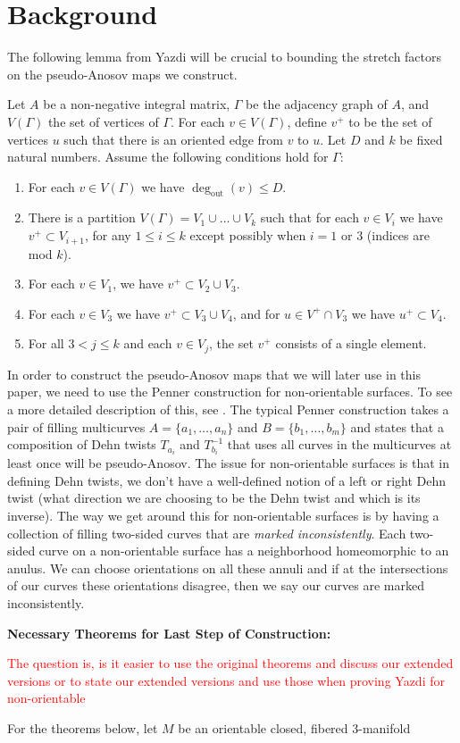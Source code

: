 \section{Background}

The following lemma from Yazdi will be crucial to bounding the stretch factors on the pseudo-Anosov maps we construct.

\begin{lem}[Yazdi]
Let $A$ be a non-negative integral matrix, $\Gamma$ be the adjacency graph of $A$, and $V(\Gamma)$ the set of vertices of $\Gamma$. For each $v \in V(\Gamma)$, define $v^+$ to be the set of vertices $u$ such that there is an oriented edge from $v$ to $u$. Let $D$ and $k$ be fixed natural numbers. Assume the following conditions hold for $\Gamma$: \begin{enumerate}
    \item For each $v \in V(\Gamma)$ we have $\deg_{\text{out}}(v) \leq D$.
    \item There is a partition $V(\Gamma) = V_1 \cup \dots \cup V_k$ such that for each $v \in V_i$ we have $v^+ \subset V_{i+1}$, for any $1 \leq i \leq k$ except possibly when $i = 1$ or 3 (indices are mod $k$).
    \item For each $v \in V_1$, we have $v^+ \subset V_2 \cup V_3$.
    \item For each $v \in V_3$ we have $v^+ \subset V_3 \cup V_4$, and for $u \in V^+ \cap V_3$ we have $u^+ \subset V_4$.
    \item For all $3 < j \leq k$ and each $v \in V_j$, the set $v^+$ consists of a single element.
\end{enumerate}
\end{lem}

In order to construct the pseudo-Anosov maps that we will later use in this paper, we need to use the Penner construction for non-orientable surfaces. To see a more detailed description of this, see \cite{Strenner_2017}. The typical Penner construction takes a pair of filling multicurves $A = \{a_1,\dots,a_n\}$ and $B = \{b_1,\dots,b_m\}$ and states that a composition of Dehn twists $T_{a_i}$ and $T_{b_i}^{-1}$ that uses all curves in the multicurves at least once will be pseudo-Anosov. The issue for non-orientable surfaces is that in defining Dehn twists, we don't have a well-defined notion of a left or right Dehn twist (what direction we are choosing to be the Dehn twist and which is its inverse). The way we get around this for non-orientable surfaces is by having a collection of filling two-sided curves that are \textit{marked inconsistently}. Each two-sided curve on a non-orientable surface has a neighborhood homeomorphic to an anulus. We can choose orientations on all these annuli and if at the intersections of our curves these orientations disagree, then we say our curves are marked inconsistently. 

\textbf{Necessary Theorems for Last Step of Construction:}

\textcolor{red}{The question is, is it easier to use the original theorems and discuss our extended versions or to state our extended versions and use those when proving Yazdi for non-orientable}

For the theorems below, let $M$ be an orientable closed, fibered 3-manifold 
